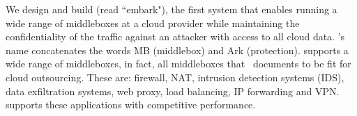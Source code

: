 %    
%    
% 
     
     
     
  
    We design and build \sys (read ``embark"), the first system that enables running a wide range of middleboxes at a cloud provider while maintaining the confidentiality of the traffic against an attacker with access to all cloud data.  \sys's name concatenates the words MB (middlebox) and Ark (protection). \sys supports a wide range of middleboxes, in fact, all middleboxes that~\cite{aplomb} documents to be fit for cloud outsourcing. These are: firewall, NAT, intrusion detection systems (IDS), data exfiltration systems, web proxy, load balancing, IP forwarding and VPN. \sys supports these applications with competitive performance. 
    
